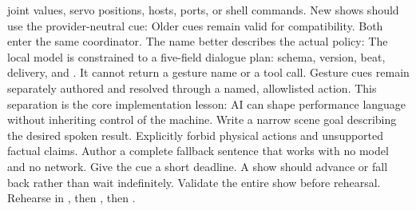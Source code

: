 {}joint values, servo positions, hosts, ports, or shell commands.\markdownRendererParagraphSeparator
{}New shows should use the provider-neutral  cue:\markdownRendererInterblockSeparator
{}\markdownRendererInterblockSeparator
{}Older  cues remain valid for compatibility. Both enter the same\markdownRendererSoftLineBreak
{}coordinator. The name  better describes the actual policy:\markdownRendererInterblockSeparator
{}\markdownRendererInterblockSeparator
{}The local model is constrained to a five-field dialogue plan: schema, version,\markdownRendererSoftLineBreak
{}beat, delivery, and . It cannot return a gesture name or a tool\markdownRendererSoftLineBreak
{}call. Gesture cues remain separately authored and resolved through a named,\markdownRendererSoftLineBreak
{}allowlisted action. This separation is the core implementation lesson: AI can\markdownRendererSoftLineBreak
{}shape performance language without inheriting control of the machine.\markdownRendererInterblockSeparator
{}\markdownRendererSectionBegin
{}\markdownRendererInterblockSeparator
{}\markdownRendererOlBegin
{}Write a narrow scene goal describing the desired spoken result.\markdownRendererOlItemEnd 
{}Explicitly forbid physical actions and unsupported factual claims.\markdownRendererOlItemEnd 
{}Author a complete fallback sentence that works with no model and no network.\markdownRendererOlItemEnd 
{}Give the cue a short deadline. A show should advance or fall back rather\markdownRendererSoftLineBreak
{}than wait indefinitely.\markdownRendererOlItemEnd 
{}Validate the entire show before rehearsal.\markdownRendererOlItemEnd 
{}Rehearse in , then , then .\markdownRendererOlItemEnd 
